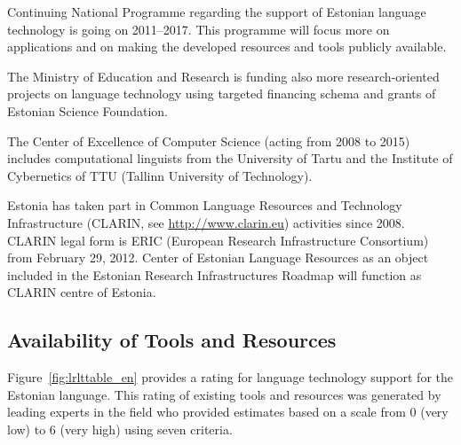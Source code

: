 \begin{multicols}{2}
Continuing National Programme \cite{ekktt2} regarding the support of Estonian language technology is going on 2011--2017. 
This programme will focus more on applications and on making the developed resources and tools publicly available.

The Ministry of Education and Research is funding also more research-oriented projects on language technology using targeted financing schema and grants of Estonian Science Foundation.

The Center of Excellence of Computer Science (acting from 2008 to 2015) includes computational linguists from the University of Tartu and the Institute of Cybernetics of TTU (Tallinn University of Technology). 

Estonia has taken part in Common Language Resources and Technology
Infrastructure (CLARIN, see  \url{http://www.clarin.eu}) activities
since 2008. CLARIN legal form is ERIC (European Research
Infrastructure Consortium) from February 29, 2012. Center of Estonian
Language Resources as an object included in the Estonian Research
Infrastructures Roadmap will function as CLARIN centre of Estonia. 
  
\subsection{Availability of Tools and Resources}

Figure~\ref{fig:lrlttable_en} provides a rating for language technology support for the Estonian language. This rating of existing tools and resources was generated by leading experts in the field who provided estimates based on a scale from 0 (very low) to 6 (very high) using seven criteria.


\end{multicols}
